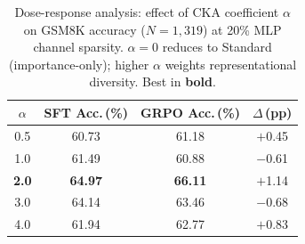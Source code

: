 \begin{table}[t]
\centering
\small
\caption{Dose-response analysis: effect of CKA coefficient $\alpha$ on GSM8K accuracy ($N{=}1{,}319$) at 20\% MLP channel sparsity. $\alpha{=}0$ reduces to Standard (importance-only); higher $\alpha$ weights representational diversity. Best in \textbf{bold}.}
\label{tab:alpha}
\begin{tabular}{@{}cccc@{}}
\toprule
$\alpha$ & SFT Acc.\,(\%) & GRPO Acc.\,(\%) & $\Delta$\,(pp) \\
\midrule
0.5 & 60.73 & 61.18 & $+$0.45 \\
1.0 & 61.49 & 60.88 & $-$0.61 \\
\textbf{2.0} & \textbf{64.97} & \textbf{66.11} & $+$1.14 \\
3.0 & 64.14 & 63.46 & $-$0.68 \\
4.0 & 61.94 & 62.77 & $+$0.83 \\
\bottomrule
\end{tabular}
\end{table}
